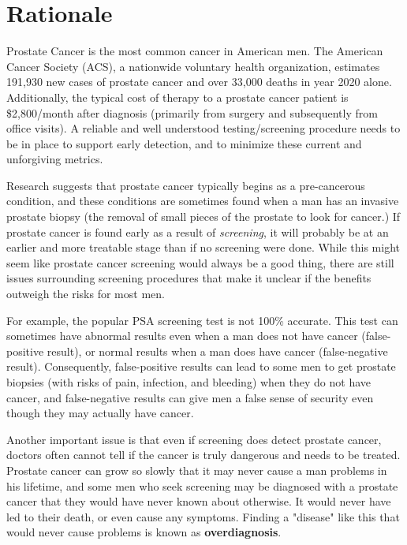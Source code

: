 %
%


\section{Rationale}
Prostate Cancer is the most common cancer in American men. The American Cancer Society (ACS), a nationwide voluntary health organization, estimates 191,930 new cases of prostate cancer and over 33,000 deaths in year 2020 alone. Additionally, the typical cost of therapy to a prostate cancer patient is \$2,800/month after diagnosis (primarily from surgery and subsequently from office visits). A reliable and well understood testing/screening procedure needs to be in place to support early detection, and to minimize these current and unforgiving metrics. \par
Research suggests that prostate cancer typically begins as a pre-cancerous condition, and these conditions are sometimes found when a man has an invasive prostate biopsy (the removal of small pieces of the prostate to look for cancer.) If prostate cancer is found early as a result of \textit{screening}, it will probably be at an earlier and more treatable stage than if no screening were done. While this might seem like prostate cancer screening would always be a good thing, there are still issues surrounding screening procedures that make it unclear if the benefits outweigh the risks for most men. \par
For example, the popular PSA screening test is not 100\% accurate. This test can sometimes have abnormal results even when a man does not have cancer (false-positive result), or normal results when a man does have cancer (false-negative result). Consequently, false-positive results can lead to some men to get prostate biopsies (with risks of pain, infection, and bleeding) when they do not have cancer, and false-negative results can give men a false sense of security even though they may actually have cancer. \par
Another important issue is that even if screening does detect prostate cancer, doctors often cannot tell if the cancer is truly dangerous and needs to be treated. Prostate cancer can grow so slowly that it may never cause a man problems in his lifetime, and some men who seek screening may be diagnosed with a prostate cancer that they would have never known about otherwise. It would never have led to their death, or even cause any symptoms. Finding a "disease" like this that would never cause problems is known as \textbf{overdiagnosis}. \par
